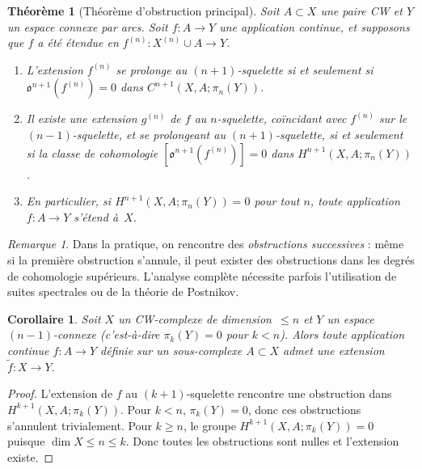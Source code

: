 \documentclass[12pt,a4paper,openany]{book}
\theoremstyle{definition}
\theoremstyle{plain}
\newtheorem{theoreme}[definition]{Théorème}
\newtheorem{corollaire}[definition]{Corollaire}
\theoremstyle{remark}
\newtheorem{remarque}[definition]{Remarque}
\begin{document}
\begin{theoreme}[Théorème d'obstruction principal]\label{thm:obstruction-principal}
  Soit $A \subset X$ une paire CW et $Y$ un espace connexe par arcs. Soit
  $f \colon A \to Y$ une application continue, et supposons que $f$ a été étendue
  en $f^{(n)} \colon X^{(n)} \cup A \to Y$.
  \begin{enumerate}[label=(\roman*)]
    \item L'extension $f^{(n)}$ se prolonge au $(n{+}1)$-squelette si et seulement si
          $\mathfrak{o}^{n+1}(f^{(n)}) = 0$ dans $C^{n+1}(X, A; \pi_n(Y))$.
    \item Il existe une extension $g^{(n)}$ de $f$ au $n$-squelette, coïncidant avec
          $f^{(n)}$ sur le $(n{-}1)$-squelette, et se prolongeant au
          $(n{+}1)$-squelette, si et seulement si la classe de cohomologie
          $[\mathfrak{o}^{n+1}(f^{(n)})] = 0$ dans $H^{n+1}(X, A; \pi_n(Y))$.
    \item En particulier, si $H^{n+1}(X, A; \pi_n(Y)) = 0$ pour tout $n$, toute
          application $f \colon A \to Y$ s'étend à~$X$.
  \end{enumerate}
\end{theoreme}

\begin{remarque}\label{rem:obstruction-itere}
  Dans la pratique, on rencontre des \emph{obstructions successives} :
  même si la première obstruction s'annule, il peut exister des obstructions
  dans les degrés de cohomologie supérieurs. L'analyse complète nécessite
  parfois l'utilisation de suites spectrales ou de la théorie de Postnikov.
\end{remarque}

\begin{corollaire}\label{cor:extension-n-connexe}
  Soit $X$ un CW-complexe de dimension~$\leq n$ et $Y$ un espace $(n{-}1)$-connexe
  (c'est-à-dire $\pi_k(Y) = 0$ pour $k < n$). Alors toute application continue
  $f \colon A \to Y$ définie sur un sous-complexe $A \subset X$ admet une extension
  $\tilde{f} \colon X \to Y$.
\end{corollaire}

\begin{proof}
  L'extension de $f$ au $(k{+}1)$-squelette rencontre une obstruction dans
  $H^{k+1}(X, A; \pi_k(Y))$. Pour $k < n$, $\pi_k(Y) = 0$, donc ces obstructions
  s'annulent trivialement. Pour $k \geq n$, le groupe $H^{k+1}(X, A; \pi_k(Y)) = 0$
  puisque $\dim X \leq n \leq k$. Donc toutes les obstructions sont nulles et
  l'extension existe.
\end{proof}
\end{document}
